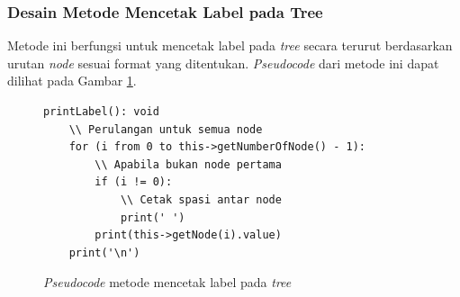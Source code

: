 \subsubsection{Desain Metode Mencetak Label pada Tree}
Metode ini berfungsi untuk mencetak label pada \textit{tree} secara terurut berdasarkan urutan \textit{node} sesuai format yang ditentukan. \textit{Pseudocode} dari metode ini dapat dilihat pada Gambar \ref{psdo:tree_printLabel}.

\begin{figure}[ht]
	\begin{lstlisting}[firstnumber=0]
	printLabel(): void
	\\ Perulangan untuk semua node
	for (i from 0 to this->getNumberOfNode() - 1):
		\\ Apabila bukan node pertama
		if (i != 0):
			\\ Cetak spasi antar node
			print(' ')
		print(this->getNode(i).value)
	print('\n')
	\end{lstlisting}
	\caption{\textit{Pseudocode} metode mencetak label pada \textit{tree}}
	\label{psdo:tree_printLabel}
\end{figure}